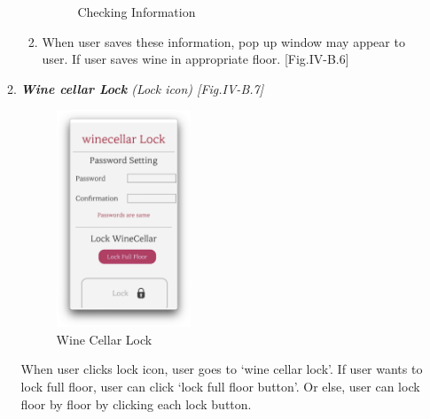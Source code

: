 \documentclass[conference]{IEEEtran}
\numberwithin{figure}{subsection}
\begin{document}
\begin{enumerate}
\begin{enumerate}
\begin{enumerate}
\begin{figure}[htb!]
                \caption{Checking Information}
            \end{figure}
            \item When user saves these information, pop up window may appear to user. If user saves wine in appropriate floor. [Fig.IV-B.6] \\
        \end{enumerate}
        
        \item \textit{\textbf{Wine cellar Lock} (Lock icon) [Fig.IV-B.7]}\\
        \begin{figure}[htb!]
            \centerline{\includegraphics[width=4cm]{lock.png}}
            \caption{Wine Cellar Lock}
        \end{figure}
        When user clicks lock icon, user goes to ‘wine cellar lock’. If user wants to lock full floor, user can click ‘lock full floor button’. Or else, user can lock floor by floor by clicking each lock button.\\
        

\end{enumerate}
\end{enumerate}
\end{document}
